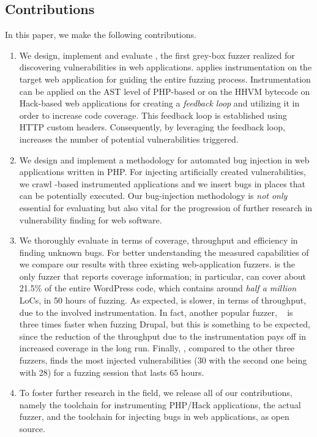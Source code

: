 \subsection{Contributions}
In this paper, we make the following contributions.

\begin{enumerate}

\item We design, implement and evaluate \pname{}, the first grey-box fuzzer
realized for discovering vulnerabilities in web applications.  \pname{}
applies instrumentation on the target web application for guiding the entire
fuzzing process.
Instrumentation can be applied on the AST level of PHP-based or on the HHVM
bytecode on Hack-based web applications for creating a \emph{feedback loop} and
utilizing it in order to increase code coverage. This feedback loop is
established using HTTP custom headers. Consequently, by leveraging the feedback
loop, \pname{} increases the number of potential vulnerabilities triggered.

\item We design and implement a methodology for automated bug injection in web
applications written in PHP. For injecting artificially created
vulnerabilities, we crawl \pname{}-based instrumented applications and we
insert bugs in places that can be potentially executed. Our bug-injection
methodology is \emph{not only} essential for evaluating \pname{} but also
vital for the progression of further research in vulnerability finding for
web software.

\item We thoroughly evaluate \pname{} in terms of coverage, throughput and
efficiency in finding unknown bugs.  For better understanding the measured
capabilities of \pname{} we compare our results with three existing
web-application fuzzers. \pname{} is the only fuzzer that reports coverage
information; in particular, \pname{} can cover about 21.5\% of the entire
WordPress code, which contains around \emph{half a million} LoCs, in 50 hours
of fuzzing. As expected, \pname{} is slower, in terms of throughput, due to the
involved instrumentation. In fact, another popular fuzzer, \wfuzz{}~\cite{wfuzz} is
three times faster when fuzzing Drupal, but this is something to be
expected, since the reduction of the throughput due to the instrumentation
pays off in increased coverage in the long run. Finally, \pname{}, compared to the
other three fuzzers, finds the most injected vulnerabilities (30 with the
second one being \wfuzz{} with 28) for a fuzzing session that lasts 65 hours.


\item To foster further research in the field, we release all of our
contributions, namely the toolchain for instrumenting PHP/Hack applications,
the actual fuzzer, and the toolchain for injecting bugs in web applications, as
open source.

\end{enumerate}





